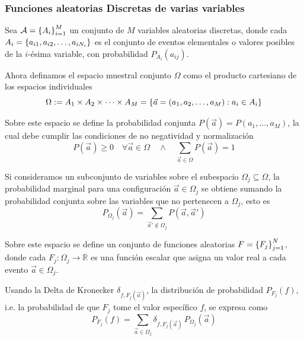 \subsubsection{Funciones aleatorias Discretas de varias variables}

Sea $\mathcal A = \left\{A_i\right\}_{i=1}^M$ un conjunto de $M$ variables aleatorias
discretas, donde cada
$A_i = \left\{a_{i1}, a_{i2}, \ldots, a_{iN_i}\right\}$ es el conjunto de eventos
elementales o valores posibles de la $i$-ésima variable, con probabilidad
$P_{A_i}(a_{ij})$.

Ahora definamos el espacio muestral conjunto $\Omega$ como el producto
cartesiano de los espacios individuales
\begin{equation}
  \Omega := A_1 \times A_2 \times \cdots \times A_M
  = \left\{\vec a = (a_1, a_2, \ldots, a_M) : a_i \in A_i\right\}
  \label{eq:omega_total}
\end{equation}

Sobre este espacio se define la probabilidad conjunta
$P(\vec a) = P(a_1, \ldots, a_M)$, la cual debe cumplir las condiciones de no
negatividad y normalización
\begin{equation}
  P(\vec a) \ge 0 \quad \forall \vec a \in \Omega
  \quad \wedge \quad
  \sum_{\vec a \in \Omega} P(\vec a) = 1
  \label{eq:prob-normalization}
\end{equation}

Si consideramos un subconjunto de variables sobre el subespacio
$\Omega_j \subseteq \Omega$, la probabilidad marginal para una configuración
$\vec a \in \Omega_j$ se obtiene sumando la probabilidad conjunta sobre las
variables que no pertenecen a $\Omega_j$, esto es
\begin{equation}
  P_{\Omega_j}(\vec a)
  = \sum_{\vec a' \notin \Omega_j} P(\vec a, \vec a')
  \label{eq:prob-marginal-omega}
\end{equation}

Sobre este espacio se define un conjunto de funciones aleatorias
$F = \left\{F_j\right\}_{j=1}^N$, donde cada $F_j: \Omega_j \to \mathbb{R}$ es una
función escalar que asigna un valor real a cada evento $\vec a \in \Omega_j$.

Usando la Delta de Kronecker $\delta_{f, F_j(\vec a)}$, la distribución de
probabilidad $P_{F_j}(f)$, i.e. la probabilidad de que $F_j$ tome el valor
específico $f$, se expresa como
\begin{equation}
  P_{F_j}(f)
  = \sum_{\vec a \in \Omega_j} \delta_{f, F_j(\vec a)} \,
  P_{\Omega_j}(\vec a)
  \label{eq:prob-fj-kronecker}
\end{equation}

